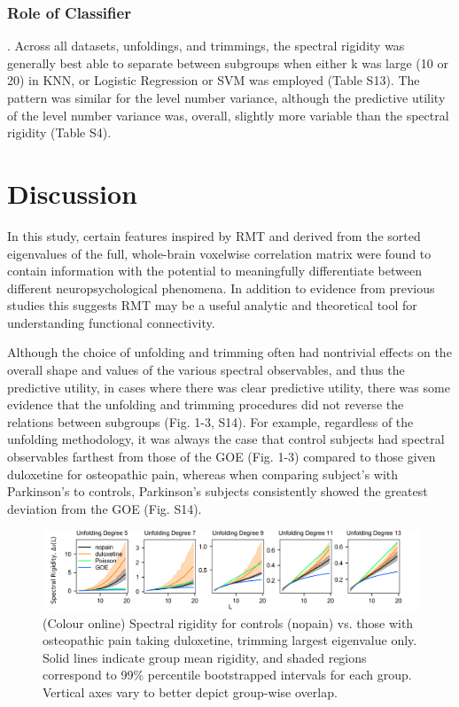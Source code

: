 \documentclass[NETN,manuscript]{stjour-new}
\begin{document}
\subsubsection{Role of Classifier}. Across all datasets, unfoldings, and trimmings, the spectral rigidity was
generally best able to separate between subgroups when either k was large (10 or 20) in KNN, or
Logistic Regression or SVM was employed (Table S13). The pattern was similar for the level number
variance, although the predictive utility of the level number variance was, overall, slightly more
variable than the spectral rigidity (Table S4).

\section{Discussion}
In this study, certain features inspired by RMT and derived from the sorted eigenvalues of the full,
whole-brain voxelwise correlation matrix were found to contain information with the potential to
meaningfully differentiate between different neuropsychological phenomena. In addition to evidence
from previous studies
\citep{sebaRandomMatrixAnalysis2003,wangRandomMatrixTheory2016,matharooSpontaneousBackpainAlters2020}
this suggests RMT may be a useful analytic and theoretical tool for understanding functional
connectivity.

Although the choice of unfolding and trimming often had nontrivial effects on the overall shape and
values of the various spectral observables, and thus the predictive utility, in cases where there
was clear predictive utility, there was some evidence that the unfolding and trimming procedures did
not reverse the relations between subgroups (Fig. 1-3, S14). For example, regardless of the
unfolding methodology, it was always the case that control subjects had spectral observables
farthest from those of the GOE (Fig. 1-3) compared to those given duloxetine for osteopathic pain,
whereas when comparing subject's with Parkinson's to controls, Parkinson's subjects consistently
showed the greatest deviation from the GOE (Fig. S14).

\begin{figure}[ht]
\centerline{\includegraphics[width=\textwidth]{figure1}} \caption{
    (Colour online) Spectral rigidity for controls (nopain) vs. those with osteopathic pain taking
    duloxetine, trimming largest eigenvalue only. Solid lines indicate group mean rigidity, and
    shaded regions correspond to 99\% percentile bootstrapped intervals for each group. Vertical
    axes vary to better depict group-wise overlap.}
\label{fig:rigidity}
\end{figure}
\end{document}
